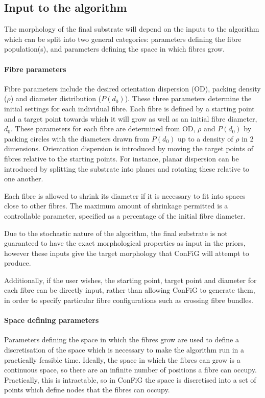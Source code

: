 \subsection{Input to the algorithm}
\label{sec:config_input}
The morphology of the final substrate will depend on the inputs to the algorithm which can be split into two general categories: parameters defining the fibre population(s), and parameters defining the space in which fibres grow.

\paragraph*{Fibre parameters}
Fibre parameters include the desired orientation dispersion (OD), packing density ($\rho$) and diameter distribution ($P(d_0)$).
These three parameters determine the initial settings for each individual fibre. 
Each fibre is defined by a starting point and a target point towards which it will grow as well as an initial fibre diameter, $d_0$.
These parameters for each fibre are determined from OD, $\rho$ and $P(d_0)$ by packing circles with the diameters drawn from $P(d_0)$ up to a density of $\rho$ in 2 dimensions. Orientation dispersion is introduced by moving the target points of fibres relative to the starting points. For instance, planar dispersion can be introduced by splitting the substrate into planes and rotating these relative to one another.

Each fibre is allowed to shrink its diameter if it is necessary to fit into spaces close to other fibres.
The maximum amount of shrinkage permitted is a controllable parameter, specified as a percentage of the initial fibre diameter.

Due to the stochastic nature of the algorithm, the final substrate is not guaranteed to have the exact morphological properties as input in the priors, however these inputs give the target morphology that ConFiG will attempt to produce.

Additionally, if the user wishes, the starting point, target point and diameter for each fibre can be directly input, rather than allowing ConFiG to generate them, in order to specify particular fibre configurations such as crossing fibre bundles.

\paragraph*{Space defining parameters}
Parameters defining the space in which the fibres grow are used to define a discretisation of the space which is necessary to make the algorithm run in a practically feasible time.
Ideally, the space in which the fibres can grow is a continuous space, so there are an infinite number of positions a fibre can occupy. Practically, this is intractable, so in ConFiG the space is discretised into a set of points which define nodes that the fibres can occupy.

